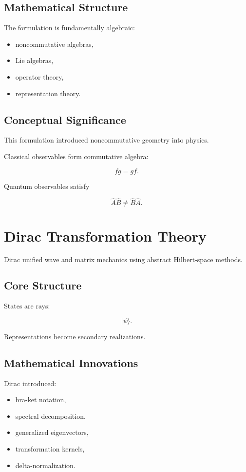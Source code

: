 \documentclass[11pt]{article}
\begin{document}
\subsection{Mathematical Structure}

The formulation is fundamentally algebraic:

\begin{itemize}
\item noncommutative algebras,
\item Lie algebras,
\item operator theory,
\item representation theory.
\end{itemize}

\subsection{Conceptual Significance}

This formulation introduced noncommutative geometry into physics.

Classical observables form commutative algebra:

\[
fg = gf.
\]

Quantum observables satisfy

\[
\hat A \hat B \neq \hat B \hat A.
\]

\section{Dirac Transformation Theory}

Dirac unified wave and matrix mechanics using abstract Hilbert-space methods.

\subsection{Core Structure}

States are rays:

\[
|\psi\rangle.
\]

Representations become secondary realizations.

\subsection{Mathematical Innovations}

Dirac introduced:

\begin{itemize}
\item bra-ket notation,
\item spectral decomposition,
\item generalized eigenvectors,
\item transformation kernels,
\item delta-normalization.
\end{itemize}
\end{document}
